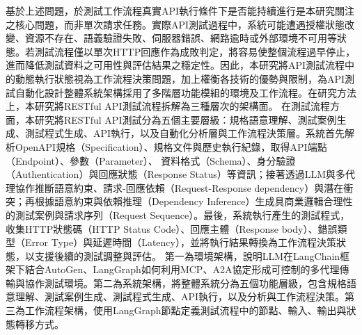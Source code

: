 \begin{ZhChapter}
\text 基於上述問題，於測試工作流程真實API執行條件下是否能持續進行是本研究關注之核心問題，而非單次請求任務。實際API測試過程中，系統可能遭遇授權狀態改變、資源不存在、語義驗證失敗、伺服器錯誤、網路逾時或外部環境不可用等狀態。若測試流程僅以單次HTTP回應作為成敗判定，將容易使整個流程過早停止，進而降低測試資料之可用性與評估結果之穩定性。因此，本研究將API測試流程中的動態執行狀態視為工作流程決策問題，加上權衡各技術的優勢與限制，為API測試自動化設計整體系統架構採用了多階層功能模組的環境及工作流程。在研究方法上，本研究將RESTful API測試流程拆解為三種層次的架構面。
\text 在測試流程方面，本研究將RESTful API測試分為五個主要層級：規格語意理解、測試案例生成、測試程式生成、API執行，以及自動化分析層與工作流程決策層。系統首先解析OpenAPI規格（Specification）、規格文件與歷史執行紀錄，取得API端點（Endpoint）、參數（Parameter）、 資料格式（Schema）、身分驗證（Authentication）與回應狀態（Response Status）等資訊；接著透過LLM與多代理協作推斷語意約束、請求-回應依賴（Request-Response dependency）與潛在衝突；再根據語意約束與依賴推理（Dependency Inference）生成具商業邏輯合理性的測試案例與請求序列（Request Sequence）。最後，系統執行產生的測試程式，收集HTTP狀態碼（HTTP Status Code）、回應主體（Response body）、錯誤類型（Error Type）與延遲時間（Latency），並將執行結果轉換為工作流程決策狀態，以支援後續的測試調整與評估。
\text 第一為環境架構，說明LLM在LangChain框架下結合AutoGen、LangGraph如何利用MCP、A2A協定形成可控制的多代理傳輸與協作測試環境。第二為系統架構，將整體系統分為五個功能層級，包含規格語意理解、測試案例生成、測試程式生成、API執行，以及分析與工作流程決策。第三為工作流程架構，使用LangGraph節點定義測試流程中的節點、輸入、輸出與狀態轉移方式。


\end{ZhChapter}
